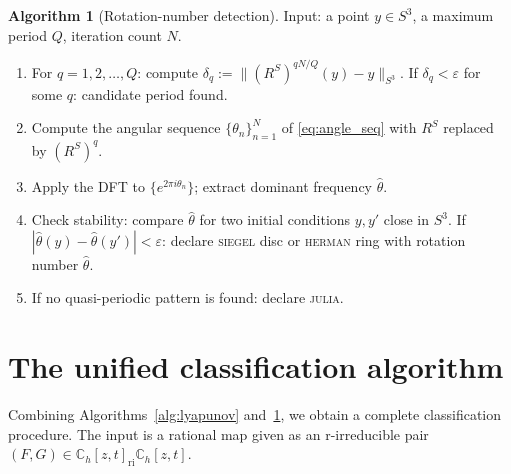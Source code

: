 \documentclass[12pt]{article}
\theoremstyle{definition}
\newtheorem{algorithm_desc}[theorem]{Algorithm}
\newcommand{\C}{\mathbb{C}}
\newcommand{\RS}{R^S}
\begin{document}
\begin{algorithm_desc}[Rotation-number detection]\label{alg:rotation}
  Input: a point $y\in S^3$, a maximum period $Q$, iteration count $N$.
  \begin{enumerate}[label=Step \arabic*.]
    \item For $q = 1, 2, \ldots, Q$: compute
          $\delta_q := \|(\RS)^{qN/Q}(y) - y\|_{S^3}$.
          If $\delta_q < \varepsilon$ for some $q$: candidate period found.
    \item Compute the angular sequence $\{\theta_n\}_{n=1}^N$ of
          \eqref{eq:angle_seq} with $\RS$ replaced by $(\RS)^q$.
    \item Apply the DFT to $\{e^{2\pi i\theta_n}\}$; extract dominant
          frequency $\hat\theta$.
    \item Check stability: compare $\hat\theta$ for two initial
          conditions $y, y'$ close in $S^3$.  If $|\hat\theta(y) -
          \hat\theta(y')| < \varepsilon$: declare \textsc{siegel} disc or
          \textsc{herman} ring with rotation number $\hat\theta$.
    \item If no quasi-periodic pattern is found: declare \textsc{julia}.
  \end{enumerate}
\end{algorithm_desc}

\section{The unified classification algorithm}
\label{sec:algorithm}

Combining Algorithms~\ref{alg:lyapunov} and~\ref{alg:rotation}, we obtain
a complete classification procedure.  The input is a rational map given as
an r-irreducible pair $(F,G) \in \C_h[z,t]_{\mathrm{ri}}\C_h[z,t]$.
\end{document}
